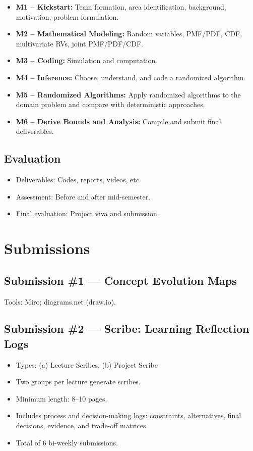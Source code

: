 \documentclass[11pt]{article}
\begin{document}
\begin{itemize}
    \item \textbf{M1 -- Kickstart:} Team formation, area identification, background, motivation, problem formulation.
    \item \textbf{M2 -- Mathematical Modeling:} Random variables, PMF/PDF, CDF, multivariate RVs, joint PMF/PDF/CDF.
    \item \textbf{M3 -- Coding:} Simulation and computation.
    \item \textbf{M4 -- Inference:} Choose, understand, and code a randomized algorithm.
    \item \textbf{M5 -- Randomized Algorithms:} Apply randomized algorithms to the domain problem and compare with deterministic approaches.
    \item \textbf{M6 -- Derive Bounds and Analysis:} Compile and submit final deliverables.
\end{itemize}

\subsection*{Evaluation}
\begin{itemize}
    \item Deliverables: Codes, reports, videos, etc.
    \item Assessment: Before and after mid-semester.
    \item Final evaluation: Project viva and submission.
\end{itemize}

\section{Submissions}

\subsection*{Submission \#1 --- Concept Evolution Maps}
Tools: Miro; diagrams.net (draw.io).

\subsection*{Submission \#2 --- Scribe: Learning Reflection Logs}
\begin{itemize}
    \item Types: (a) Lecture Scribes, (b) Project Scribe
    \item Two groups per lecture generate scribes.
    \item Minimum length: 8--10 pages.
    \item Includes process and decision-making logs: constraints, alternatives, final decisions, evidence, and trade-off matrices.
    \item Total of 6 bi-weekly submissions.
\end{itemize}
\end{document}
